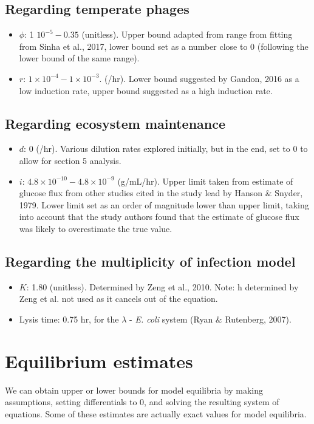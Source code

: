 \documentclass{article}
\begin{document}
\subsection{Regarding temperate phages}
\begin{itemize}
\item $\phi$: 1 \times $10^{-5} - 0.35$ (unitless). Upper bound adapted from range from fitting from Sinha et al., 2017, lower bound set as a number close to 0 (following the lower bound of the same range). 

\item $r$: $1 \times 10^{-4} - 1 \times 10^{-3}$. (/hr). Lower bound suggested by Gandon, 2016 as a low induction rate, upper bound suggested as a high induction rate. 
\end{itemize}

\subsection{Regarding ecosystem maintenance}
\begin{itemize}
\item $d$: 0 (/hr). Various dilution rates explored initially, but in the end, set to 0 to allow for section 5 analysis.

\item $i$: $4.8 \times 10^{-10} - 4.8 \times 10^{-9}$ (g/mL/hr). Upper limit taken from estimate of glucose flux from other studies cited in the study lead by Hanson $\&$ Snyder, 1979. Lower limit set as an order of magnitude lower than upper limit, taking into account that the study authors found that the estimate of glucose flux was likely to overestimate the true value.
\end{itemize}

\subsection{Regarding the multiplicity of infection model}
\begin{itemize}
\item $K$: 1.80 (unitless). Determined by Zeng et al., 2010. Note: h determined by Zeng et al. not used as it cancels out of the equation. 

\item Lysis time: 0.75 hr, for the $\lambda$ - \textit{E. coli} system (Ryan $\&$ Rutenberg, 2007). 
\end{itemize}

\section {Equilibrium estimates}
We can obtain upper or lower bounds for model equilibria by making assumptions, setting differentials to 0, and solving the resulting system of equations. Some of these estimates are actually exact values for model equilibria.
\end{document}
